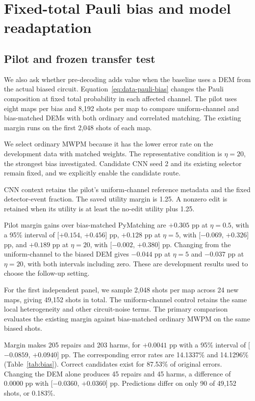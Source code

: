\documentclass[aps,prd,12pt,twocolumn,superscriptaddress,floatfix]{revtex4-2}
\begin{document}
\section{Fixed-total Pauli bias and model readaptation}
\label{sec:bias}

\subsection{Pilot and frozen transfer test}

We also ask whether pre-decoding adds value when the baseline uses a DEM from the actual biased circuit. Equation~\ref{eq:data-pauli-bias} changes the Pauli composition at fixed total probability in each affected channel. The pilot uses eight maps per bias and 8,192 shots per map to compare uniform-channel and bias-matched DEMs with both ordinary and correlated matching. The existing margin runs on the first 2,048 shots of each map.

We select ordinary MWPM because it has the lower error rate on the development data with matched weights. The representative condition is \(\eta=20\), the strongest bias investigated. Candidate CNN seed 2 and its existing selector remain fixed, and we explicitly enable the candidate route.

CNN context retains the pilot's uniform-channel reference metadata and the fixed detector-event fraction. The saved utility margin is 1.25. A nonzero edit is retained when its utility is at least the no-edit utility plus 1.25.

Pilot margin gains over bias-matched PyMatching are \(+0.305\) pp at \(\eta=0.5\), with a 95\% interval of [\( +0.154\), \(+0.456\)] pp, \(+0.128\) pp at \(\eta=5\), with [\(-0.069\), \(+0.326\)] pp, and \(+0.189\) pp at \(\eta=20\), with [\(-0.002\), \(+0.380\)] pp. Changing from the uniform-channel to the biased DEM gives \(-0.044\) pp at \(\eta=5\) and \(-0.037\) pp at \(\eta=20\), with both intervals including zero. These are development results used to choose the follow-up setting.

For the first independent panel, we sample 2,048 shots per map across 24 new maps, giving 49,152 shots in total. The uniform-channel control retains the same local heterogeneity and other circuit-noise terms. The primary comparison evaluates the existing margin against bias-matched ordinary MWPM on the same biased shots.

Margin makes 205 repairs and 203 harms, for \(+0.0041\) pp with a 95\% interval of [\(-0.0859\), \(+0.0940\)] pp. The corresponding error rates are 14.1337\% and 14.1296\% (Table~\ref{tab:bias}). Correct candidates exist for 87.53\% of original errors. Changing the DEM alone produces 45 repairs and 45 harms, a difference of 0.0000 pp with [\(-0.0360\), \(+0.0360\)] pp. Predictions differ on only 90 of 49,152 shots, or 0.183\%.
\end{document}
